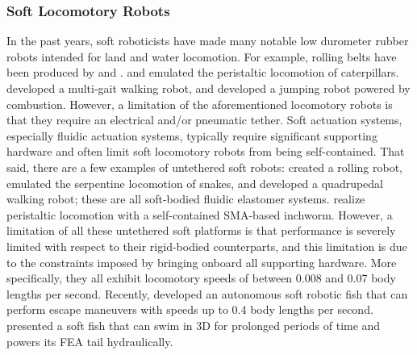 \subsubsection{Soft Locomotory Robots}
\label{subsubsec:RW Land}
In the past years, soft roboticists have made many notable low durometer rubber robots intended for land and water locomotion.
For example, rolling belts have been produced by \citet{correll2010soft} and \citet{marchese2011soft}.
\citet{trimmer2006caterpillar} and \citet{umedachi2013highly} emulated the peristaltic locomotion of caterpillars. \citet{shepherd2011multigait} developed a multi-gait walking robot, and \citet{shepherd2013using} developed a jumping robot powered by combustion.
However, a limitation of the aforementioned locomotory robots is that they require an electrical and/or pneumatic tether.
Soft actuation systems, especially fluidic actuation systems, typically require significant supporting hardware and often limit soft locomotory robots from being self-contained.
That said, there are a few examples of untethered soft robots:
\citet{onal2011soft} created a rolling robot, \citet{onal2013autonomous} emulated the serpentine locomotion of snakes, and \cite{tolley2014resilient} developed a quadrupedal walking robot; these are all soft-bodied fluidic elastomer systems.
\citet{seok2010peristaltic} realize peristaltic locomotion with a self-contained SMA-based inchworm.
However, a limitation of all these untethered soft platforms is that performance is severely limited with respect to their rigid-bodied counterparts, and this limitation is due to the constraints imposed by bringing onboard all supporting hardware.
More specifically, they all exhibit locomotory speeds of between 0.008 and 0.07 body lengths per second.
Recently, \citet{marchese2014autonomous} developed an autonomous soft robotic fish that can perform escape maneuvers with speeds up to 0.4 body lengths per second. \citet{katzschmann2014hydraulic} presented a soft fish that can swim in 3D for prolonged periods of time and powers its FEA tail hydraulically.

